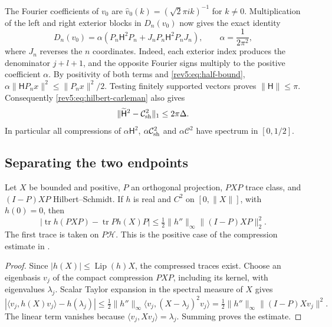 The Fourier coefficients of $v_0$ are
$\widehat v_0(k)=(\sqrt2\pi i k)^{-1}$ for $k\ne0$.
Multiplication of the left and right exterior blocks in $D_n(v_0)$ now
gives the exact identity
\begin{equation}\label{rev5:eq:hilbert-corners}
 D_n(v_0)=\alpha(P_n\mathsf H^2P_n+J_nP_n\mathsf H^2P_nJ_n),
 \qquad \alpha=\frac1{2\pi^2},
\end{equation}
where $J_n$ reverses the $n$ coordinates.  Indeed, each exterior index
produces the denominator $j+l+1$, and the opposite Fourier signs
multiply to the positive coefficient $\alpha$.
By positivity of both terms and \eqref{rev5:eq:half-bound},
$\alpha\|\mathsf H P_nx\|^2\leq\|P_nx\|^2/2$.
Testing finitely supported vectors proves $\|\mathsf H\|\leq\pi$.
Consequently \eqref{rev5:eq:hilbert-carleman} also gives
\begin{equation}\label{rev5:eq:square-comparison}
 \|\widetilde{\mathsf H}^2-\mathcal C_{\rm sh}^2\|_1
 \leq2\pi\Delta.
\end{equation}
In particular all compressions of $\alpha\mathsf H^2$,
$\alpha\mathcal C_{\rm sh}^2$ and $\alpha\mathcal C^2$ have
spectrum in $[0,1/2]$.

\subsection{Separating the two endpoints}
\label{rev5:subsec:corners}

\begin{lemma}\label{rev5:lem:compression}
Let $X$ be bounded and positive, $P$ an orthogonal projection, $PXP$
trace class, and $(I-P)XP$ Hilbert--Schmidt.  If $h$ is real and
$C^2$ on $[0,\|X\|]$, with $h(0)=0$, then
\begin{equation}\label{rev5:eq:compression}
 |\operatorname{tr}h(PXP)-\operatorname{tr}Ph(X)P|
 \leq\tfrac12\|h''\|_\infty\|(I-P)XP\|_2^2.
\end{equation}
The first trace is taken on $P\mathscr H$.  This is the positive case
of the compression estimate in \cite[Theorem~1.2]{LaptevSafarov1996}.
\end{lemma}

\begin{proof}
Since $|h(X)|\leq\operatorname{Lip}(h)X$, the compressed traces exist.
Choose an eigenbasis $v_j$ of the compact compression $PXP$, including
its kernel, with eigenvalues $\lambda_j$.  Scalar Taylor expansion in
the spectral measure of $X$ gives
\[
 |\langle v_j,h(X)v_j\rangle-h(\lambda_j)|
 \leq\tfrac12\|h''\|_\infty
                 \langle v_j,(X-\lambda_j)^2v_j\rangle
 =\tfrac12\|h''\|_\infty\|(I-P)Xv_j\|^2.
\]
The linear term vanishes because
$\langle v_j,Xv_j\rangle=\lambda_j$.  Summing proves the estimate.
\end{proof}

